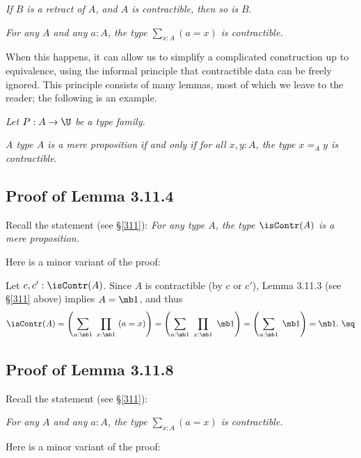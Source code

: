 \documentclass[12pt]{article}
\begin{document}
\nn{} \emph{If $B$ is a retract of $A$, and $A$ is contractible, then so is} $B$.

\nn{} \emph{For any $A$ and any $a:A$, the type $\sum_{x:A}(a=x)$ is contractible.}

When this happens, it can allow us to simplify a complicated construction up to equivalence, using the informal principle that contractible data can be freely ignored. This principle consists of many lemmas, most of which we leave to the reader; the following is an example.

\nn{} \emph{Let $P:A\to\U$ be a type family.}

\nn{} \emph{A type $A$ is a mere proposition if and only if for all $x,y:A$, the type $x=_Ay$ is contractible.}


\subsection{Proof of Lemma 3.11.4} 

Recall the statement (see \S\ref{311}): \emph{For any type $A$, the type $\isContr(A)$ is a mere proposition.}

Here is a minor variant of the proof:

Let $c,c':\isContr(A)$. Since $A$ is contractible (by $c$ or $c'$), Lemma 3.11.3 (see \S\ref{311} above) implies $A=\mb1$, and thus 
$$
\isContr(A)=\left(\sum_{a:\mb1}\ \prod_{x:\mb1}\ (a=x)\right)=\left(\sum_{a:\mb1}\ \prod_{x:\mb1}\ \mb1\right)=\left(\sum_{a:\mb1}\ \mb1\right)=\mb1.\ \sq
$$


\subsection{Proof of Lemma 3.11.8} 

Recall the statement (see \S\ref{311}): 

\nn\emph{For any $A$ and any $a:A$, the type $\sum_{x:A}(a=x)$ is contractible.}

Here is a minor variant of the proof:
\end{document}
